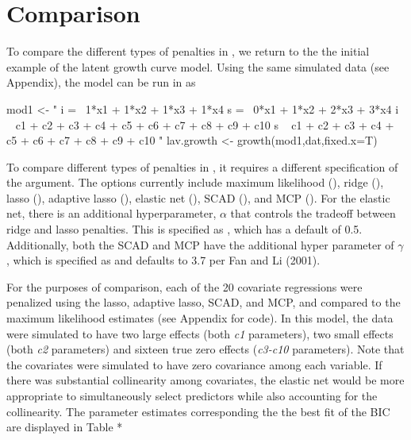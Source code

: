 \documentclass[article]{jss}
\begin{document}
\section{Comparison}\label{comparison}

To compare the different types of penalties in , we return
to the the initial example of the latent growth curve model. Using the
same simulated data (see Appendix), the model can be run in 
as

\begin{CodeChunk}
\begin{CodeInput}
mod1 <- "
i =~ 1*x1 + 1*x2 + 1*x3 + 1*x4
s =~ 0*x1 + 1*x2 + 2*x3 + 3*x4
i ~ c1 + c2 + c3 + c4 + c5 + c6 + c7 + c8 + c9 + c10
s ~ c1 + c2 + c3 + c4 + c5 + c6 + c7 + c8 + c9 + c10
"
lav.growth <- growth(mod1,dat,fixed.x=T)
\end{CodeInput}
\end{CodeChunk}

To compare different types of penalties in , it requires a
different specification of the  argument. The options
currently include maximum likelihood (), ridge
(), lasso (), adaptive lasso
(), elastic net (), SCAD (),
and MCP (). For the elastic net, there is an additional
hyperparameter, \(\alpha\) that controls the tradeoff between ridge and
lasso penalties. This is specified as  , which has a
default of 0.5. Additionally, both the SCAD and MCP have the additional
hyper parameter of \(\gamma\), which is specified as  and
defaults to 3.7 per Fan and Li (2001).

For the purposes of comparison, each of the 20 covariate regressions
were penalized using the lasso, adaptive lasso, SCAD, and MCP, and
compared to the maximum likelihood estimates (see Appendix for code). In
this model, the data were simulated to have two large effects (both
\textit{c1} parameters), two small effects (both \textit{c2} parameters)
and sixteen true zero effects (\textit{c3-c10} parameters). Note that
the covariates were simulated to have zero covariance among each
variable. If there was substantial collinearity among covariates, the
elastic net would be more appropriate to simultaneously select
predictors while also accounting for the collinearity. The parameter
estimates corresponding the the best fit of the BIC are displayed in
Table *
\end{document}
